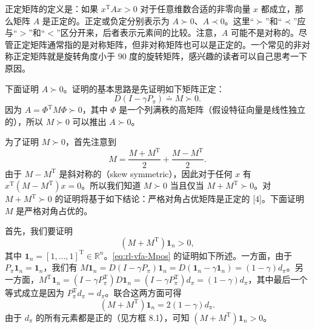 \begin{note}[方框 8.4：证明矩阵 $A = \Phi^{\mathrm{T}}D(I - \gamma P_{\pi})\Phi$ 可逆且正定]
正定矩阵的定义是：如果 $x^{\mathrm{T}}Ax > 0$ 对于任意维数合适的非零向量 $x$ 都成立，那么矩阵 $A$ 是正定的。正定或负定分别表示为 $A \succ 0$、$A \prec 0$。这里“$\succ$”和“$\prec$”应与“$>$”和“$<$”区分开来，后者表示元素间的比较。注意，$A$ 可能不是对称的。尽管正定矩阵通常指的是对称矩阵，但非对称矩阵也可以是正定的。一个常见的非对称正定矩阵就是旋转角度小于 $90$ 度的旋转矩阵，感兴趣的读者可以自己思考一下原因。

下面证明 $A \succ 0$。证明的基本思路是先证明如下矩阵正定：
\begin{equation}
D (I - \gamma P_{\pi}) \doteq M \succ 0.
\label{eq:rl-vfa-M}
\end{equation}
因为 $A = \Phi^{\mathrm{T}}M\Phi \succ 0$，其中 $\Phi$ 是一个列满秩的高矩阵（假设特征向量是线性独立的），所以 $M\succ 0$ 可以推出 $A\succ 0$。

为了证明 $M \succ 0$，首先注意到
\begin{equation*}
M = \frac{M + M^{\mathrm{T}}}{2} + \frac{M - M^{\mathrm{T}}}{2}.
\end{equation*}
由于 $M - M^{\mathrm{T}}$ 是斜对称的（skew symmetric），因此对于任何 $x$ 有 $x^{\mathrm{T}}(M - M^{\mathrm{T}})x = 0$。所以我们知道 $M\succ 0$ 当且仅当 $M + M^{\mathrm{T}}\succ 0$。对 $M + M^{\mathrm{T}}\succ 0$ 的证明将基于如下结论：严格对角占优矩阵是正定的 [4]。下面证明 $M$ 是严格对角占优的。

首先，我们要证明
\begin{equation}
(M + M^{\mathrm{T}}) \mathbf{1}_{n} > 0,
\label{eq:rl-vfa-Mpos}
\end{equation}
其中 $\mathbf{1}_n = [1,\dots,1]^{\mathrm{T}}\in \mathbb{R}^n$。\cref{eq:rl-vfa-Mpos} 的证明如下所述。一方面，由于 $P_{\pi}\mathbf{1}_{n} = \mathbf{1}_{n}$，我们有 $M\mathbf{1}_n = D(I - \gamma P_\pi)\mathbf{1}_n = D(\mathbf{1}_n - \gamma \mathbf{1}_n) = (1 - \gamma)d_\pi$。另一方面，$M^{\mathrm{T}}\mathbf{1}_n = (I - \gamma P_{\pi}^{\mathrm{T}})D\mathbf{1}_n = (I - \gamma P_\pi^{\mathrm{T}})d_\pi = (1 - \gamma)d_\pi$，其中最后一个等式成立是因为 $P_{\pi}^{\mathrm{T}}d_{\pi} = d_{\pi}$。联合这两方面可得
\begin{equation*}
(M + M^{\mathrm{T}}) \mathbf{1}_{n} = 2 (1 - \gamma) d_{\pi}.
\end{equation*}
由于 $d_{\pi}$ 的所有元素都是正的（见方框 8.1），可知 $(M + M^{\mathrm{T}})\mathbf{1}_n > 0$。


\end{note}
